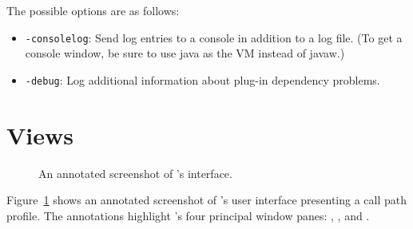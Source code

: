 The possible options are as follows:
\begin{itemize}

 \item \texttt{-consolelog}: Send log entries to a console in addition to a log file.
   (To get a console window, be sure to use java as the VM instead of javaw.)

 \item \texttt{-debug}: Log additional information about plug-in dependency problems.
\end{itemize}



\section{Views}

\begin{figure}[t]
\caption{An annotated screenshot of \hpctraceviewer{}'s interface.}
\label{fig:hpctraceviewer-legend}
\end{figure}

Figure~\ref{fig:hpctraceviewer-legend} shows an annotated screenshot of \hpctraceviewer{}'s user interface presenting a call path profile.
The annotations highlight \hpctraceviewer{}'s four principal window panes: \traceview, \depthview, \callview{} and \miniview.

